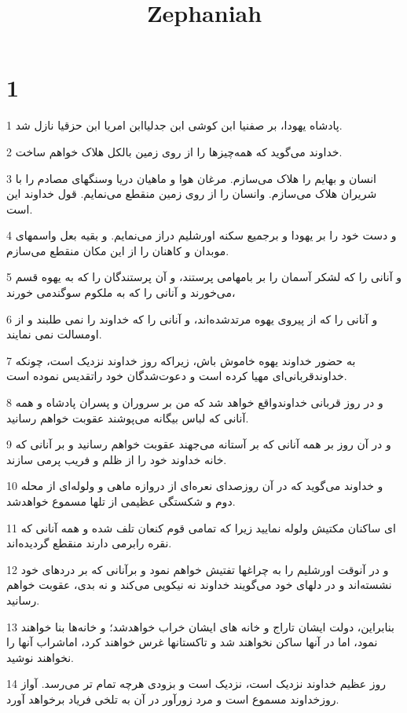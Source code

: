 

\title{Zephaniah}


\chapter{1}

\par 1 پادشاه یهودا، بر صفنیا ابن کوشی ابن جدلیاابن امریا ابن حزقیا نازل شد.
\par 2 خداوند می‌گوید که همه‌چیزها را از روی زمین بالکل هلاک خواهم ساخت.
\par 3 انسان و بهایم را هلاک می‌سازم. مرغان هوا و ماهیان دریا وسنگهای مصادم را با شریران هلاک می‌سازم. وانسان را از روی زمین منقطع می‌نمایم. قول خداوند این است.
\par 4 و دست خود را بر یهودا و برجمیع سکنه اورشلیم دراز می‌نمایم. و بقیه بعل واسمهای موبدان و کاهنان را از این مکان منقطع می‌سازم.
\par 5 و آنانی را که لشکر آسمان را بر بامهامی پرستند، و آن پرستندگان را که به یهوه قسم می‌خورند و آنانی را که به ملکوم سوگندمی خورند،
\par 6 و آنانی را که از پیروی یهوه مرتدشده‌اند، و آنانی را که خداوند را نمی طلبند و از اومسالت نمی نمایند.
\par 7 به حضور خداوند یهوه خاموش باش، زیراکه روز خداوند نزدیک است، چونکه خداوندقربانی‌ای مهیا کرده است و دعوت‌شدگان خود راتقدیس نموده است.
\par 8 و در روز قربانی خداوندواقع خواهد شد که من بر سروران و پسران پادشاه و همه آنانی که لباس بیگانه می‌پوشند عقوبت خواهم رسانید.
\par 9 و در آن روز بر همه آنانی که بر آستانه می‌جهند عقوبت خواهم رسانید و بر آنانی که خانه خداوند خود را از ظلم و فریب پرمی سازند.
\par 10 و خداوند می‌گوید که در آن روزصدای نعره‌ای از دروازه ماهی و ولوله‌ای از محله دوم و شکستگی عظیمی از تلها مسموع خواهدشد.
\par 11 ‌ای ساکنان مکتیش ولوله نمایید زیرا که تمامی قوم کنعان تلف شده و همه آنانی که نقره رابرمی دارند منقطع گردیده‌اند.
\par 12 و در آنوقت اورشلیم را به چراغها تفتیش خواهم نمود و برآنانی که بر دردهای خود نشسته‌اند و در دلهای خود می‌گویند خداوند نه نیکویی می‌کند و نه بدی، عقوبت خواهم رسانید.
\par 13 بنابراین، دولت ایشان تاراج و خانه های ایشان خراب خواهدشد؛ و خانه‌ها بنا خواهند نمود، اما در آنها ساکن نخواهند شد و تاکستانها غرس خواهند کرد، اماشراب آنها را نخواهند نوشید.
\par 14 روز عظیم خداوند نزدیک است، نزدیک است و بزودی هرچه تمام تر می‌رسد. آواز روزخداوند مسموع است و مرد زورآور در آن به تلخی فریاد برخواهد آورد.
